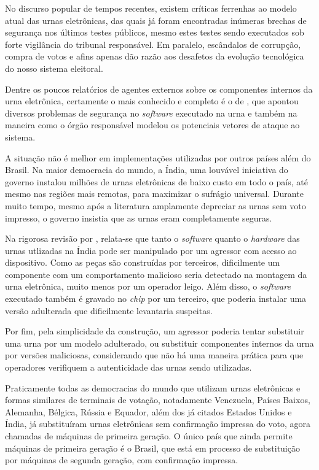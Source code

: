 No discurso popular de tempos recentes, existem críticas ferrenhas ao modelo
atual das urnas eletrônicas, das quais já foram encontradas inúmeras brechas de
segurança nos últimos testes públicos, mesmo estes testes sendo executados sob
forte vigilância do tribunal responsável. Em paralelo, escândalos de corrupção,
compra de votos e afins apenas dão razão aos desafetos da evolução tecnológica
do nosso sistema eleitoral.

Dentre os poucos relatórios de agentes externos sobre os componentes internos
da urna eletrônica, certamente o mais conhecido e completo é o de
\textcite{aranha2012vulnerabilidades}, que apontou diversos problemas de
segurança no \textit{software} executado na urna e também na maneira como o
órgão responsável modelou os potenciais vetores de ataque ao sistema.

A situação não é melhor em implementações utilizadas por outros países além do
Brasil. Na maior democracia do mundo, a Índia, uma louvável iniciativa do
governo instalou milhões de urnas eletrônicas de baixo custo em todo o país,
até mesmo nas regiões mais remotas, para maximizar o sufrágio universal.
Durante muito tempo, mesmo após a literatura amplamente depreciar as urnas sem
voto impresso, o governo insistia que as urnas eram completamente seguras.

Na rigorosa revisão por \textcite{wolchok2010security}, relata-se que tanto o
\textit{software} quanto o \textit{hardware} das urnas utlizadas na Índia pode
ser manipulado por um agressor com acesso ao dispositivo. Como as peças são
construídas por terceiros, dificilmente um componente com um comportamento
malicioso seria detectado na montagem da urna eletrônica, muito menos por um
operador leigo. Além disso, o \textit{software} executado também é gravado no
\textit{chip} por um terceiro, que poderia instalar uma versão adulterada que
dificilmente levantaria suspeitas.

Por fim, pela simplicidade da construção, um agressor poderia tentar substituir
uma urna por um modelo adulterado, ou substituir componentes internos da urna
por versões maliciosas, considerando que não há uma maneira prática para que
operadores verifiquem a autenticidade das urnas sendo utilizadas.

Praticamente todas as democracias do mundo que utilizam urnas eletrônicas
 e formas similares de
terminais de votação, notadamente Venezuela, Países Baixos, Alemanha, Bélgica,
Rússia e Equador, além dos já citados Estados Unidos e Índia, já substituíram
urnas eletrônicas sem confirmação impressa do voto, agora chamadas de máquinas
de primeira geração. O único país que ainda permite máquinas de primeira
geração é o Brasil, que está em processo de substituição por máquinas de
segunda geração, com confirmação impressa.
